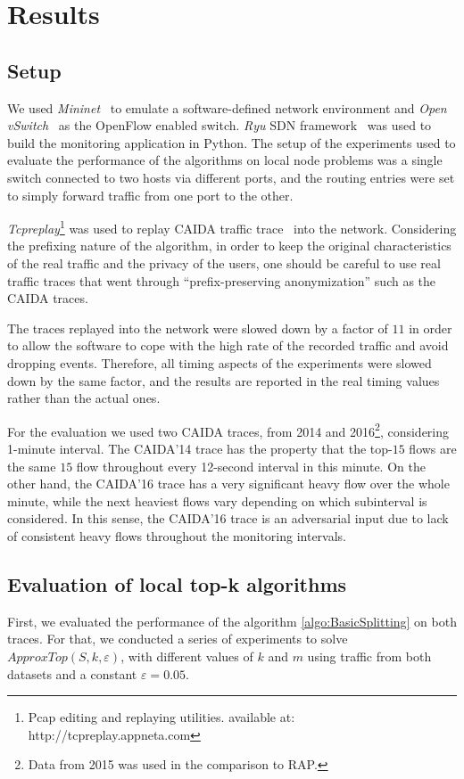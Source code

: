 \section{Results}
\subsection{Setup}
We used \textit{Mininet}~\cite{conf/hotnets/LantzHM10, Mininet} to emulate a software-defined network environment and \textit{Open vSwitch}~\cite{Pfaff2009, OVS} as the OpenFlow enabled switch. \textit{Ryu} SDN framework~\cite{Ryu} was used to build the monitoring application in Python. The setup of the experiments used to evaluate the performance of the algorithms on local node problems was a single switch connected to two hosts via different ports, and the routing entries were set to simply forward traffic from one port to the other.

\textit{Tcpreplay}\footnote{Pcap editing and replaying utilities. available at: http://tcpreplay.appneta.com} was used to replay CAIDA traffic trace~\cite{CAIDA14, CAIDA2016} into the network. Considering the prefixing nature of the algorithm, in order to keep the original characteristics of the real traffic and the privacy of the users, one should be careful to use real traffic traces that went through ``prefix-preserving anonymization'' such as the CAIDA traces.

The traces replayed into the network were slowed down by a factor of $11$ in order to allow the software to cope with the high rate of the recorded traffic and avoid dropping events. Therefore, all timing aspects of the experiments were slowed down by the same factor, and the results are reported in the real timing values rather than the actual ones.

For the evaluation we used two CAIDA traces, from 2014 and 2016\footnote{Data from 2015 was used in the comparison to RAP.}, considering 1-minute interval. The CAIDA'14 trace has the property that the top-$15$ flows are the same $15$ flow throughout every 12-second interval in this minute.
On the other hand, the CAIDA'16 trace has a very significant heavy flow over the whole minute, while the next heaviest flows vary depending on which subinterval is considered. In this sense, the CAIDA'16 trace is an adversarial input due to lack of consistent heavy flows throughout the monitoring intervals.

\subsection{Evaluation of local top-k algorithms}
First, we evaluated the performance of the algorithm \ref{algo:BasicSplitting} on both traces. For that, we conducted a series of experiments to solve $ApproxTop(S,k,\varepsilon)$, with different values of $k$ and $m$ using traffic from both datasets and a constant $\varepsilon=0.05$.

